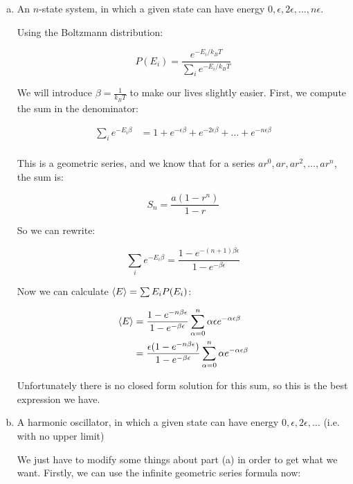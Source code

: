 \documentclass{article}
\begin{document}
    \begin{enumerate}[(a)]
        \item An $n$-state system, in which a given state can have energy $0, \epsilon, 2\epsilon, \dots, n\epsilon$.
        
        \begin{solution}
            Using the Boltzmann distribution: 

            \[ P(E_i) = \frac{e^{-E_i/k_BT}}{\sum_i e^{-E_i/k_BT}}\]

            We will introduce $\beta = \frac{1}{k_BT}$ to make our lives slightly easier. First, we compute the sum in the denominator:

            \begin{align*}
                \sum_i e^{-E_i \beta} &= 1 + e^{-\epsilon \beta} + e^{-2\epsilon \beta} + \dots + e^{-n\epsilon \beta}\\
            \end{align*}

            This is a geometric series, and we know that for a series $ar^0, ar, ar^2, \dots, ar^n$, the sum is:

            \[ S_n = \frac{a(1-r^n)}{1-r}\]

            So we can rewrite: 

            \[ \sum_i e^{-E_i \beta} = \frac{1-e^{-(n+1)\beta \epsilon}}{1 - e^{-\beta \epsilon}}\]

            Now we can calculate $\langle E \rangle = \sum E_i P(E_i)$: 

            \begin{align*}
                \langle E \rangle &= \frac{1 - e^{-n\beta\epsilon}}{1 - e^{-\beta \epsilon}}\sum_{\alpha = 0}^n \alpha \epsilon e^{-\alpha \epsilon \beta}\\
                &=\frac{\epsilon(1 - e^{-n\beta\epsilon})}{1 - e^{-\beta \epsilon}}\sum_{\alpha = 0}^n \alpha e^{-\alpha \epsilon\beta} 
            \end{align*}

            Unfortunately there is no closed form solution for this sum, so this is the best expression we have.
        \end{solution}
        \item A harmonic oscillator, in which a given state can have energy $0, \epsilon, 2\epsilon, \dots$ (i.e. with no upper limit)
        
        \begin{solution}
            We just have to modify some things about part (a) in order to get what we want. Firstly, we can use the infinite geometric series formula now:


\end{solution}
\end{enumerate}
\end{document}
